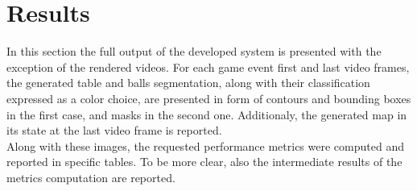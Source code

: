 \section{Results}
In this section the full output of the developed system is presented with the exception of the rendered videos.
For each game event first and last video frames, the generated table and balls segmentation, along with their classification expressed as a color choice,
are presented in form of contours and bounding boxes in the first case, and masks in the second one.
Additionaly, the generated map in its state at the last video frame is reported.
\\
Along with these images, the requested performance metrics were computed and reported in specific tables.
To be more clear, also the intermediate results of the metrics computation are reported.


